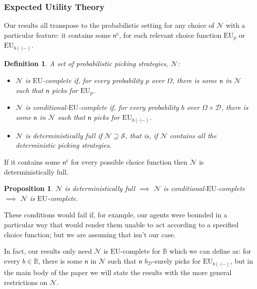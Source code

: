 \documentclass[a4paper]{article}
\newtheorem{definition}{Definition}
\newtheorem{proposition}[theorem]{Proposition}
\newcommand\EU{\mathrm{EU}}
\newcommand{\Decs}{\mathcal{D}}
\renewcommand\S{\mathcal{S}}
\renewcommand\c{\mathsf{c}} %
\newcommand{\n}{\mathsf{n}}
\renewcommand{\nu}{\n}
\newcommand\Nu{\mathcal{N}}
\newcommand{\IB}{\mathbb{B}}
\renewcommand{\color}[1]{}
\newenvironment{colored}[1]{\leavevmode\color{#1}}{}
\newenvironment{CCM rewritten}
{\begingroup\color{blue}} %
{\endgroup}              %
\begin{document}
\subsubsection{Expected Utility Theory}

Our results all transpose to the probabilistic setting for any choice of $\Nu$ with a particular feature: it contains some $\nu^\c$, for each relevant choice function $\EU_p$ or $\EU_{b(\cdot|-)}$.
\begin{definition}\label{def:EU-complete}
	A set of probabilistic picking strategies, $\Nu$:
	
	\begin{itemize}
		\item $\Nu$ is \emph{$\EU$-complete} if, for every probability $p$ over $\Omega$, there is some $\n$ in $\Nu$ such that $\n$ picks for $\EU_p$.
	
	\item $\Nu$ is \emph{conditional-$\EU$-complete} if, for every probability $b$ over $\Omega\times\Decs$, there is some $\n$ in $\Nu$ such that $\n$ picks for $\EU_{b(\cdot|-)}$.

		
	\item $\Nu$ is \emph{deterministically full} if $\Nu\supseteq\S$, that is, if $\Nu$  contains all the deterministic picking strategies. 
	\end{itemize}

		

\end{definition}
If it contains some $\nu^\c$ for every possible choice function then $\Nu$ is deterministically full. 
\begin{proposition}\label{thm:EU-complete}
 $\Nu$ is deterministically full
		$\implies$  $\Nu$ is  conditional-$\EU$-complete 
		$\implies$  $\Nu$ is  $\EU$-complete.
\end{proposition}

These conditions would fail if, for example, our agents were bounded in a particular way that would render them unable to act according to a specified choice function; but we are assuming that isn't our case. 

In fact, our results only need 	$\Nu$ is {$\EU$-complete for $\IB$} which we can define as: for every  $b\in \IB$, there is some $\n$ in $\Nu$ such that $\n$ $b_\Decs$-surely picks for $\EU_{b(\cdot|-)}$,  but in the main body of the paper we will state the results with the more general restrictions on $\Nu$.
	
\end{document}
